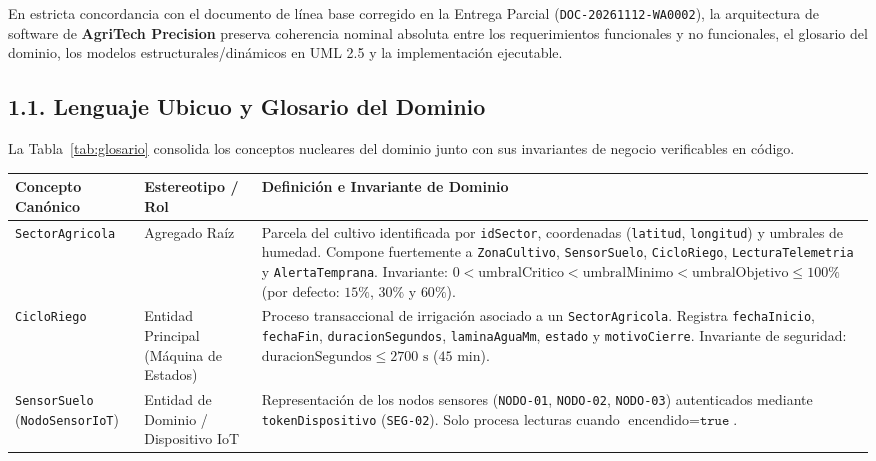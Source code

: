 \documentclass[12pt,letterpaper]{report}
\begin{document}
En estricta concordancia con el documento de línea base corregido en la Entrega Parcial (\texttt{DOC-20261112-WA0002}), la arquitectura de software de \textbf{AgriTech Precision} preserva coherencia nominal absoluta entre los requerimientos funcionales y no funcionales, el glosario del dominio, los modelos estructurales/dinámicos en UML 2.5 y la implementación ejecutable.

\subsection*{1.1. Lenguaje Ubicuo y Glosario del Dominio}

La Tabla~\ref{tab:glosario} consolida los conceptos nucleares del dominio junto con sus invariantes de negocio verificables en código.

\begin{table}[H]
    \centering
    \small
    \renewcommand{\arraystretch}{1.3}
    \begin{tabularx}{\linewidth}{|L{3.5cm}|L{3.2cm}|Y|}
        \hline
        \textbf{Concepto Canónico} & \textbf{Estereotipo / Rol} & \textbf{Definición e Invariante de Dominio} \\
        \hline
        \texttt{SectorAgricola} & Agregado Raíz & Parcela del cultivo identificada por \texttt{idSector}, coordenadas (\texttt{latitud}, \texttt{longitud}) y umbrales de humedad. Compone fuertemente a \texttt{ZonaCultivo}, \texttt{SensorSuelo}, \texttt{CicloRiego}, \texttt{LecturaTelemetria} y \texttt{AlertaTemprana}. Invariante: $0 < \text{umbralCritico} < \text{umbralMinimo} < \text{umbralObjetivo} \le 100\%$ (por defecto: $15\%$, $30\%$ y $60\%$). \\
        \hline
        \texttt{CicloRiego} & Entidad Principal (Máquina de Estados) & Proceso transaccional de irrigación asociado a un \texttt{SectorAgricola}. Registra \texttt{fechaInicio}, \texttt{fechaFin}, \texttt{duracionSegundos}, \texttt{laminaAguaMm}, \texttt{estado} y \texttt{motivoCierre}. Invariante de seguridad: $\text{duracionSegundos} \le 2700\text{ s}$ ($45\text{ min}$). \\
        \hline
        \texttt{SensorSuelo} (\texttt{NodoSensorIoT}) & Entidad de Dominio / Dispositivo IoT & Representación de los nodos sensores (\texttt{NODO-01}, \texttt{NODO-02}, \texttt{NODO-03}) autenticados mediante \texttt{tokenDispositivo} (\texttt{SEG-02}). Solo procesa lecturas cuando $\text{encendido} = \texttt{true}$. \\

\end{tabularx}
\end{table}
\end{document}
